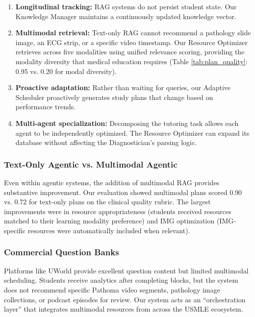\begin{enumerate}
    \item \textbf{Longitudinal tracking:} RAG systems do not persist student state. Our Knowledge Manager maintains a continuously updated knowledge vector.
    
    \item \textbf{Multimodal retrieval:} Text-only RAG cannot recommend a pathology slide image, an ECG strip, or a specific video timestamp. Our Resource Optimizer retrieves across five modalities using unified relevance scoring, providing the modality diversity that medical education requires (Table \ref{tab:plan_quality}: 0.95 vs. 0.20 for modal diversity).
    
    \item \textbf{Proactive adaptation:} Rather than waiting for queries, our Adaptive Scheduler proactively generates study plans that change based on performance trends.
    
    \item \textbf{Multi-agent specialization:} Decomposing the tutoring task allows each agent to be independently optimized. The Resource Optimizer can expand its database without affecting the Diagnostician's parsing logic.
\end{enumerate}

\subsubsection{Text-Only Agentic vs. Multimodal Agentic}

Even within agentic systems, the addition of multimodal RAG provides substantive improvement. Our evaluation showed multimodal plans scored 0.90 vs. 0.72 for text-only plans on the clinical quality rubric. The largest improvements were in resource appropriateness (students received resources matched to their learning modality preference) and IMG optimization (IMG-specific resources were automatically included when relevant).

\subsubsection{Commercial Question Banks}

Platforms like UWorld provide excellent question content but limited multimodal scheduling. Students receive analytics after completing blocks, but the system does not recommend specific Pathoma video segments, pathology image collections, or podcast episodes for review. Our system acts as an ``orchestration layer'' that integrates multimodal resources from across the USMLE ecosystem.

